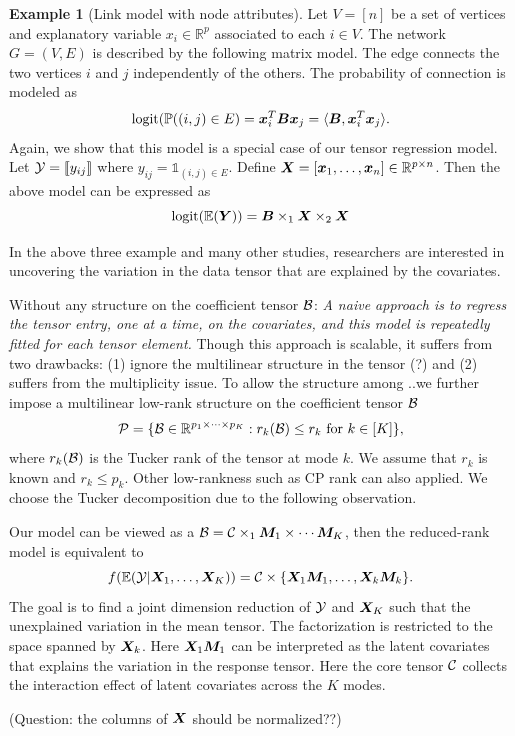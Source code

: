 \documentclass[twoside]{article}
\theoremstyle{plain}
\theoremstyle{definition}
\newtheorem{example}{Example}
\begin{document}
 \begin{example}[Link model with node attributes] Let $V=[n]$ be a set of vertices and explanatory variable $x_i\in\mathbb{R}^p$ associated to each $i\in V$. The network $G=(V,E)$ is described by the following matrix model. The edge connects the two vertices $i$ and $j$ independently of the others. The probability of connection is modeled as
 \[
 \text{logit}(\mathbb{P}((i,j)\in E)=\bm x^T_i\bm B\bm x_j=\langle \bm B, \bm x^T_i\bm x_j\rangle.
 \]
Again, we show that this model is a special case of our tensor regression model. Let $\mathcal{Y}=\llbracket y_{ij} \rrbracket$ where $y_{ij}=\mathds{1}_{(i,j)\in E}$. Define $\bm X=[\bm x_1,\ldots,\bm x_n]\in\mathbb{R}^{p\times n}$. Then the above model can be expressed as
 \[
 \text{logit}(\mathbb{E}(\bm Y))=\bm B\times_1\bm X\times_2\bm X
 \]
\end{example}
In the above three example and many other studies, researchers are interested in uncovering the variation in the data tensor that are explained by the covariates. 

Without any structure on the coefficient tensor $\mathcal{B}$: \emph{A naive approach is to regress the tensor entry, one at a time, on the covariates, and this model is repeatedly fitted for each tensor element.} Though this approach is scalable, it suffers from two drawbacks: (1) ignore the multilinear structure in the tensor (?) and (2) suffers from the multiplicity issue. To allow the structure among ..we further impose a multilinear low-rank structure on the coefficient tensor $\mathcal{B}$
\[
\mathcal{P}=\{\mathcal{B}\in\mathbb{R}^{p_1\times \cdots \times p_K}: r_k(\mathcal{B})\leq r_k \text{ for } k\in[K]\},
\]
where $r_k(\mathcal{B})$ is the Tucker rank of the tensor at mode $k$. We assume that $r_k$ is known and $r_k\leq p_k$. Other low-rankness such as CP rank can also applied. We choose the Tucker decomposition due to the following observation. 

Our model can be viewed as a $\mathcal{B}=\mathcal{C}\times_1\bm M_1\times \cdots\bm M_K$, then the reduced-rank model is equivalent to
\[
f(\mathbb{E}(\mathcal{Y}|\bm X_1,\ldots,\bm X_K))=\mathcal{C}\times\{\bm X_1\bm M_1,\ldots,\bm X_k\bm M_k\}.
\]
The goal is to find a joint dimension reduction of $\mathcal{Y}$ and $\bm X_K$ such that the unexplained variation in the mean tensor. The factorization is restricted to the space spanned by $\bm X_k$. Here $\bm X_1\bm M_1$ can be interpreted as the latent covariates that explains the variation in the response tensor. Here the core tensor $\mathcal{C}$ collects the interaction effect of latent covariates across the $K$ modes.  

(Question: the columns of $\bm X$ should be normalized??)
\end{document}
